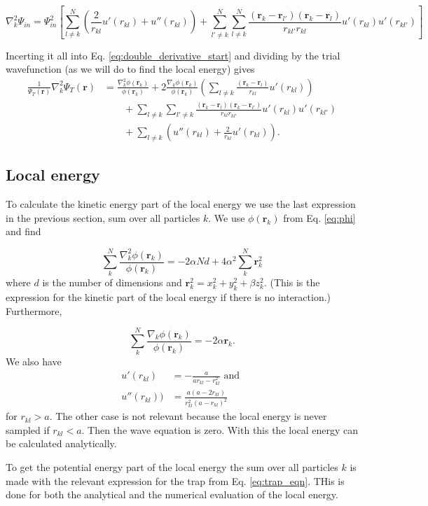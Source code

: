 $$\nabla^2_k\Psi_{in} = \Psi^2_{in} \left[\sum^N_{l \neq k} \left( \frac{2}{r_{kl}}u'(r_{kl}) + u''(r_{kl})\right) +   \sum^N_{l' \neq k} \sum^N_{l \neq k} \frac{(\mathbf{r}_k - \mathbf{r}_{l'})(\mathbf{r}_k - \mathbf{r}_{l})}{r_{kl'}r_{kl}}  u'(r_{kl})u'(r_{kl'}) \right] $$

Incerting it all into Eq. \ref{eq:double_derivative_start} and dividing by the trial wavefunction (as we will do to find the local energy) gives
\begin{align*}
   \frac{1}{\Psi_T(\mathbf{r})}\nabla_k^2\Psi_T(\mathbf{r})
   &= \frac{\nabla_k^2\phi(\mathbf{r}_k)}{\phi(\mathbf{r}_k)}
   + 2\frac{\nabla_k\phi(\mathbf{r}_k)}{\phi(\mathbf{r}_k)}
   \left(\sum_{l\ne k}\frac{(\mathbf{r}_k-\mathbf{r}_l)}{r_{kl}}u'(r_{kl})\right)
   \\
   &\qquad
   + \sum_{l\ne k}\sum_{l' \ne k}\frac{(\mathbf{r}_k-\mathbf{r}_l)(\mathbf{r}_k-\mathbf{r}_{l'})}{r_{kl}r_{kl'}}u'(r_{kl})u'(r_{kl'})
   \\
   &\qquad
   + \sum_{l\ne k}\left( u''(r_{kl})+\frac{2}{r_{kl}}u'(r_{kl})\right).
\end{align*}

\subsection{Local energy}

To calculate the kinetic energy part of the local energy we use the last expression in the previous section, sum over all particles $k$. We use $\phi(\mathbf{r}_k)$ from Eq. \ref{eq:phi} and find 

$$ \sum_k^N\frac{\nabla_k^2\phi(\mathbf{r}_k)}{\phi(\mathbf{r}_k)} = -2\alpha Nd + 4 \alpha^2 \sum_k^N \mathbf{r}_k^2 $$ where $d$ is the number of dimensions and $\mathbf{r}_k^2 = x_k^2 + y_k^2+\beta z_k^2$. (This is the expression for the kinetic part of the local energy if there is no interaction.) Furthermore,

$$ \sum_k^N\frac{\nabla_k\phi(\mathbf{r}_k)}{\phi(\mathbf{r}_k)} = -2\alpha  \mathbf{r}_k. $$ 
We also have
\begin{align*}
u'(r_{kl}) &= -\frac{a}{ar_{kl}-r_{kl}^2} \text{ and }\\
u''(r_{kl}) ) &= \frac{a(a-2r_{kl})}{r_{kl}^2(a-r_{kl})^2}
\end{align*} for $r_{kl} > a$. The other case is not relevant because the local energy is never sampled if $r_{kl} < a$. Then the wave equation is zero. With this the local energy can be calculated analytically.

To get the potential energy part of the local energy the sum over all particles $k$ is made with the relevant expression for the trap from Eq. \ref{eq:trap_eqn}. THis is done for both the analytical and the numerical evaluation of the local energy.
